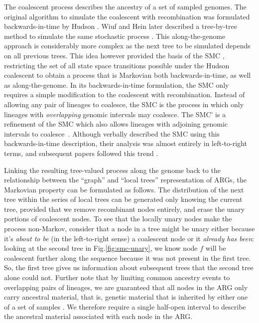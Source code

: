 \documentclass{article}
\begin{document}
%
The coalescent process describes the ancestry of a set of sampled genomes.
The original algorithm
to simulate the coalescent with
recombination was formulated backwards-in-time 
by Hudson \citeyearpar{hudson_properties_1983}.
Wiuf and Hein later described
a tree-by-tree method to simulate the same stochastic process
\citep{wiuf_recombination_1999}.
This along-the-genome approach is considerably more complex as the next
tree to be simulated depends on all previous trees.
This idea however provided the basis of the
SMC \citep{mcvean_approximating_2005}, restricting the set of all state
space transitions possible under the Hudson coalescent to
obtain a process that is Markovian both backwards-in-time,
as well as along-the-genome. 
In its backwards-in-time formulation, the SMC only requires a
simple modification to the coalescent with recombination.
Instead of allowing any pair of lineages to coalesce,
the SMC is the process in which only lineages with \emph{overlapping}
genomic intervals may coalesce. The SMC' is a refinement
of the SMC which also allows lineages with adjoining genomic intervals 
to coalesce~\citep{marjoram_fast_2006}.
Although \citet{mcvean_approximating_2005} verbally described the SMC
using this backwards-in-time description, their analysis
was almost entirely in left-to-right terms,
and subsequent papers followed this trend
\citep{li_inference_2011,paul_accurate_2011,schiffels_inferring_2014,
rasmussen_genome-wide_2014}.

Linking the resulting tree-valued process 
along the genome back to the relationship between the ``graph'' and
``local trees'' representation of ARGs,
the Markovian property can be formulated as follows.
The distribution of the next tree within the series
of local trees can be generated only knowing the current tree,
provided that we remove recombinant nodes entirely,
and erase the unary portions of coalescent nodes.
To see that the locally unary nodes make the process non-Markov,
consider that a node in a tree might be unary either because
it's \emph{about to be} (in the left-to-right sense) a coalescent node
or it \emph{already has been}:
looking at the second tree in Fig.\ref{fig:smc-unary},
we know node $f$ will be coalescent further along the sequence
because it was not present in the first tree.
So, the first tree gives us information about subsequent trees
that the second tree alone could not.
Further note that by limiting common ancestry events to overlapping
pairs of lineages, we are guaranteed that all nodes in the ARG
only carry ancestral material, that is,
genetic material that is inherited by either one of a set of samples
\citep{wiuf_ancestry_1999}.
We therefore require a single half-open interval to describe
the ancestral
material associated with each node in the ARG.
\end{document}
